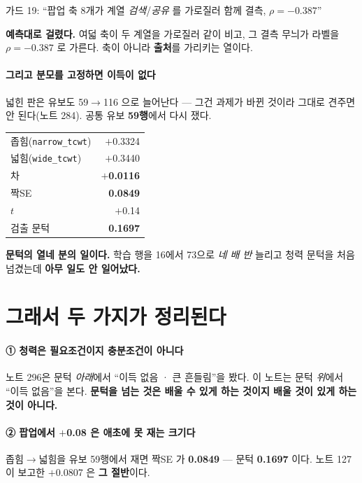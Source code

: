 \documentclass[10pt]{article}
\begin{document}
\begin{center}\footnotesize
가드 19: ``팝업 축 8개가 계열 \emph{검색}/\emph{공유} 를 가로질러 함께 결측,
$\rho{=}{-}0.387$''
\end{center}

\textbf{예측대로 걸렸다.} 여덟 축이 두 계열을 가로질러 같이 비고, 그 결측
무늬가 라벨을 $\rho{=}{-}0.387$ 로 가른다. 축이 아니라 \textbf{출처}를 가리키는
열이다.

\paragraph{그리고 분모를 고정하면 이득이 없다} 넓힌 판은 유보도 59$\to$116
으로 늘어난다 --- 그건 과제가 바뀐 것이라 그대로 견주면 안 된다(노트 284).
공통 유보 \textbf{59행}에서 다시 쟀다.

\begin{center}\small
\begin{tabular}{lr}
\hline
좁힘(\texttt{narrow\_tcwt}) & $+$0.3324 \\
넓힘(\texttt{wide\_tcwt}) & $+$0.3440 \\
\hline
차 & \textbf{$+$0.0116} \\
짝SE & \textbf{0.0849} \\
$t$ & $+$0.14 \\
검출 문턱 & \textbf{0.1697} \\
\hline
\end{tabular}
\end{center}

\textbf{문턱의 열네 분의 일이다.} 학습 행을 16에서 73으로 \emph{네 배 반}
늘리고 청력 문턱을 처음 넘겼는데 \textbf{아무 일도 안 일어났다.}

\section{그래서 두 가지가 정리된다}

\paragraph{① 청력은 필요조건이지 충분조건이 아니다} 노트 296은 문턱
\emph{아래}에서 ``이득 없음 · 큰 흔들림''을 봤다. 이 노트는 문턱 \emph{위}에서
``이득 없음''을 본다. \textbf{문턱을 넘는 것은 배울 수 있게 하는 것이지
배울 것이 있게 하는 것이 아니다.}

\paragraph{② 팝업에서 $+$0.08 은 애초에 못 재는 크기다} 좁힘$\to$넓힘을
유보 59행에서 재면 짝SE 가 \textbf{0.0849} --- 문턱 \textbf{0.1697} 이다.
노트 127이 보고한 $+$0.0807 은 \textbf{그 절반}이다.
\end{document}
